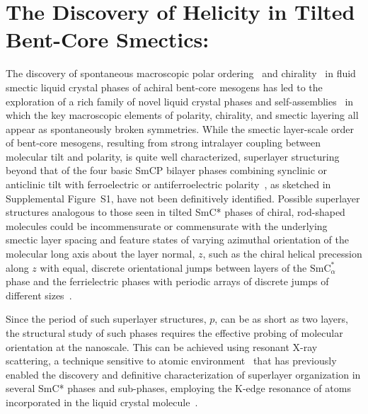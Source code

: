 \documentclass[aagreenthesis]{subfiles}
\begin{document}
\chapter{The Discovery of Helicity in Tilted Bent-Core Smectics: \smcpalpha{}}

The discovery of spontaneous macroscopic polar
ordering~\cite{niori_distinct_1996} and chirality~\cite{link_spontaneous_1997} in
fluid smectic liquid crystal phases of achiral  bent-core mesogens has led to
the exploration of a rich family of novel liquid crystal phases and
self-assemblies~\cite{takezoe_bent-core_2006,eremin_polar_2013,takezoe2017bent,chattham_triclinic_2010,reddy_spontaneous_2011}
 in which the key macroscopic elements of polarity, chirality, and smectic layering all appear as spontaneously broken symmetries.
While the smectic layer-scale order of bent-core mesogens, resulting from strong intralayer
coupling between molecular tilt and polarity, is quite well characterized, superlayer
structuring beyond that of the four basic SmCP bilayer phases combining synclinic or
anticlinic tilt with ferroelectric or antiferroelectric
polarity~\cite{link_spontaneous_1997}, as sketched in Supplemental Figure~S1, have
not been definitively identified.
Possible superlayer structures analogous to those seen in tilted SmC*
phases of chiral, rod-shaped molecules could be incommensurate or commensurate with the
underlying smectic layer spacing and feature states of varying azimuthal orientation
of the molecular long axis about the layer normal, $z$, such as the chiral
helical precession along $z$ with equal, discrete orientational jumps between layers of
the $\mathrm{SmC}^*_\alpha$ phase and the ferrielectric phases with periodic arrays of discrete jumps of
different sizes~\cite{takezoe2010antiferroelectric}.

Since the period of such superlayer structures, $p$,  can be as short as two
layers, the structural study of such phases requires the
effective probing of molecular orientation at the nanoscale. This can be
achieved using resonant X-ray scattering, a technique sensitive to atomic
environment~\cite{mach_structural_1998,levelut1999tensorial,mach_structures_1999,hirst2002interlayer,gleeson_resonant_2006,Barois2012review,folcia2014spontaneous,huang2015liquid,zhu2015probing,zhu2016resonant,salamonczyk2017structure}
that has previously enabled the discovery and
definitive characterization of superlayer organization in several SmC* phases and sub-phases, employing
the K-edge resonance of atoms incorporated in the liquid crystal molecule~\cite{mach_structural_1998,mach_structures_1999}.
\end{document}
